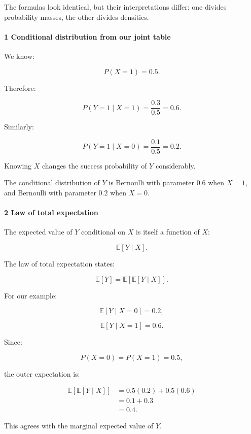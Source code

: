 The formulas look identical, but their interpretations differ: one divides probability masses, the other divides densities.

\paragraph{1 Conditional distribution from our joint table}\label{conditional-distribution-from-our-joint-table}

We know:

\[
 P(X=1)=0.5.
\]

Therefore:

\[
 P(Y=1\mid X=1) = \frac{0.3}{0.5} =\boxed{0.6}.
\]

Similarly:

\[
 P(Y=1\mid X=0) = \frac{0.1}{0.5} =\boxed{0.2}.
\]

Knowing \(X\) changes the success probability of \(Y\) considerably.

The conditional distribution of \(Y\) is Bernoulli with parameter \(0.6\) when \(X=1\), and Bernoulli with parameter \(0.2\) when \(X=0\).

\paragraph{2 Law of total expectation}\label{law-of-total-expectation}

The expected value of \(Y\) conditional on \(X\) is itself a function of \(X\):

\[
 \mathbb E[Y\mid X].
\]

The law of total expectation states:

\[
 \boxed{ \mathbb E[Y]= \mathbb E[\mathbb E[Y\mid X]] }.
\]

For our example:

\[
 \mathbb E[Y\mid X=0]=0.2,
\]

\[
 \mathbb E[Y\mid X=1]=0.6.
\]

Since:

\[
 P(X=0)=P(X=1)=0.5,
\]

the outer expectation is:

\[
 \begin{aligned} \mathbb E[\mathbb E[Y\mid X]] &=0.5(0.2)+0.5(0.6)\\ &=0.1+0.3\\ &=\boxed{0.4}. \end{aligned}
\]

This agrees with the marginal expected value of \(Y\).

